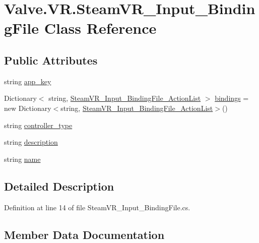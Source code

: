 \hypertarget{class_valve_1_1_v_r_1_1_steam_v_r___input___binding_file}{}\section{Valve.\+V\+R.\+Steam\+V\+R\+\_\+\+Input\+\_\+\+Binding\+File Class Reference}
\label{class_valve_1_1_v_r_1_1_steam_v_r___input___binding_file}
\subsection*{Public Attributes}
\begin{DoxyCompactItemize}
\item 
string \mbox{\hyperlink{class_valve_1_1_v_r_1_1_steam_v_r___input___binding_file_aecc7eb55ca1134fdb4c668d7d997065a}{app\+\_\+key}}
\item 
Dictionary$<$ string, \mbox{\hyperlink{class_valve_1_1_v_r_1_1_steam_v_r___input___binding_file___action_list}{Steam\+V\+R\+\_\+\+Input\+\_\+\+Binding\+File\+\_\+\+Action\+List}} $>$ \mbox{\hyperlink{class_valve_1_1_v_r_1_1_steam_v_r___input___binding_file_a270b416b897044452ca6946f4bf01938}{bindings}} = new Dictionary$<$string, \mbox{\hyperlink{class_valve_1_1_v_r_1_1_steam_v_r___input___binding_file___action_list}{Steam\+V\+R\+\_\+\+Input\+\_\+\+Binding\+File\+\_\+\+Action\+List}}$>$()
\item 
string \mbox{\hyperlink{class_valve_1_1_v_r_1_1_steam_v_r___input___binding_file_a2bb8f41af919a73a470eedbcf9f847be}{controller\+\_\+type}}
\item 
string \mbox{\hyperlink{class_valve_1_1_v_r_1_1_steam_v_r___input___binding_file_a0e8f9a0cf9df9f64863555e46cebc2c1}{description}}
\item 
string \mbox{\hyperlink{class_valve_1_1_v_r_1_1_steam_v_r___input___binding_file_a14c3d3fecbaecc6f23557b15f70ef232}{name}}
\end{DoxyCompactItemize}


\subsection{Detailed Description}


Definition at line 14 of file Steam\+V\+R\+\_\+\+Input\+\_\+\+Binding\+File.\+cs.



\subsection{Member Data Documentation}
\mbox{\label{class_valve_1_1_v_r_1_1_steam_v_r___input___binding_file_aecc7eb55ca1134fdb4c668d7d997065a}} 
